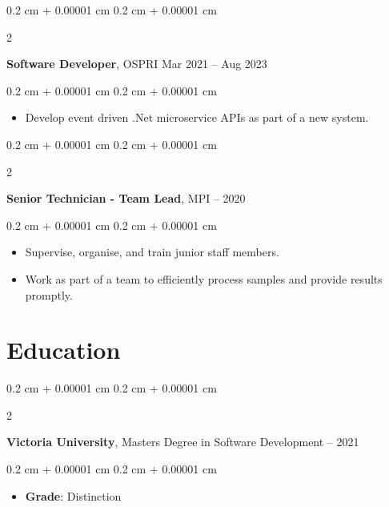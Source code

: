 \documentclass[10pt, letterpaper]{article}
\newenvironment{highlights}{
    \begin{itemize}[
        topsep=0.10 cm,
        parsep=0.10 cm,
        partopsep=0pt,
        itemsep=0pt,
        leftmargin=0.4 cm + 10pt
    ]
}{
    \end{itemize}
} %
\newenvironment{onecolentry}{
    \begin{adjustwidth}{
        0.2 cm + 0.00001 cm
    }{
        0.2 cm + 0.00001 cm
    }
}{
    \end{adjustwidth}
} %
\newenvironment{twocolentry}[2][]{
    \onecolentry
    \def\secondColumn{#2}
    \setcolumnwidth{\fill, 4.5 cm}
    \begin{paracol}{2}
}{
    \switchcolumn \raggedleft \secondColumn
    \end{paracol}
    \endonecolentry
} %
\begin{document}
        \vspace{0.2 cm}

        \begin{twocolentry}{
            Mar 2021 – Aug 2023
        }
            \textbf{Software Developer}, OSPRI\end{twocolentry}

        \vspace{0.10 cm}
        \begin{onecolentry}
            \begin{highlights}
                \item Develop event driven .Net microservice APIs as part of a new system.
            \end{highlights}
        \end{onecolentry}


        \vspace{0.2 cm}

        \begin{twocolentry}{
            2018 – 2020
        }
            \textbf{Senior Technician - Team Lead}, MPI\end{twocolentry}

        \vspace{0.10 cm}
        \begin{onecolentry}
            \begin{highlights}
                \item Supervise, organise, and train junior staff members.
                \item Work as part of a team to efficiently process samples and provide results promptly.
            \end{highlights}
        \end{onecolentry}



    
    \section{Education}



        
        \begin{twocolentry}{
            2020 – 2021
        }
            \textbf{Victoria University}, Masters Degree in Software Development\end{twocolentry}

        \vspace{0.10 cm}
        \begin{onecolentry}
            \begin{highlights}
                \item \textbf{Grade}: Distinction
            \end{highlights}
        \end{onecolentry}
\end{document}
